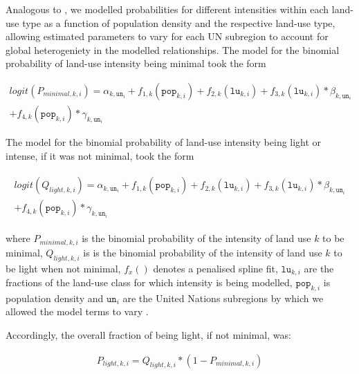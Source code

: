 \documentclass[titlesmallcaps,copyrightpage]{uomthesis}\usepackage[]{graphicx}\usepackage[]{color}
\begin{document}
Analogous to \citet{newbold_global_2015}, we modelled probabilities for different intensities within each land-use type as a function of population density and the respective land-use type, allowing estimated parameters to vary for each UN subregion to account for global heterogeniety in the modelled relationships. The model for the binomial probability of land-use intensity being minimal took the form

\begin{equation}
\begin{split}
logit(P_{minimal,k,i}) = \alpha_{k, \texttt{un}_i} + f_{1,k}(\texttt{pop}_{k,i}) + f_{2,k}(\texttt{lu}_{k,i})  + f_{3,k}(\texttt{lu}_{k,i}) * \beta_{k, \texttt{un}_i} \\ 
+ f_{4,k}(\texttt{pop}_{k,i}) * \gamma_{k, \texttt{un}_i}
    \end{split}
    \label{ch4:eq_fminimal}
\end{equation}

The model for the binomial probability of land-use intensity being light or intense, if it was not minimal, took the form

\begin{equation}
\begin{aligned}
\begin{split}
logit(Q_{light,k,i}) = \alpha_{k, \texttt{un}_i} + f_{1,k}(\texttt{pop}_{k,i}) + f_{2,k}(\texttt{lu}_{k,i}) + f_{3,k}(\texttt{lu}_{k,i}) * \beta_{k, \texttt{un}_i} \\ 
+ f_{4,k}(\texttt{pop}_{k,i}) * \gamma_{k, \texttt{un}_i}
\end{split}
\end{aligned}
\end{equation}

where \(P_{minimal,k,i}\) is the binomial probability of the intensity of land use \(k\) to be minimal, \(Q_{light,k,i}\) is is the binomial probability of the intensity of land use \(k\) to be light when not minimal, \(f_x()\) denotes a penalised spline fit, \(\texttt{lu}_{k,i}\) are the fractions of the land-use class for which intensity is being modelled, \(\texttt{pop}_{k,i}\) is population density \citep{gao_global_2020} and \(\texttt{un}_{i}\) are the United Nations subregions by which we allowed the model terms to vary \citep{newbold_global_2015}.

Accordingly, the overall fraction of being light, if not minimal, was:

\begin{equation}
\begin{aligned}
 P_{light,k,i} = Q_{light,k,i} * (1 - P_{minimal,k,i})
\end{aligned}
\end{equation}
\end{document}
